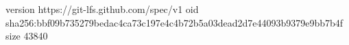 version https://git-lfs.github.com/spec/v1
oid sha256:bbf09b735279bedac4ca73c197e4c4b72b5a03dead2d7e44093b9379e9bb7b4f
size 43840
